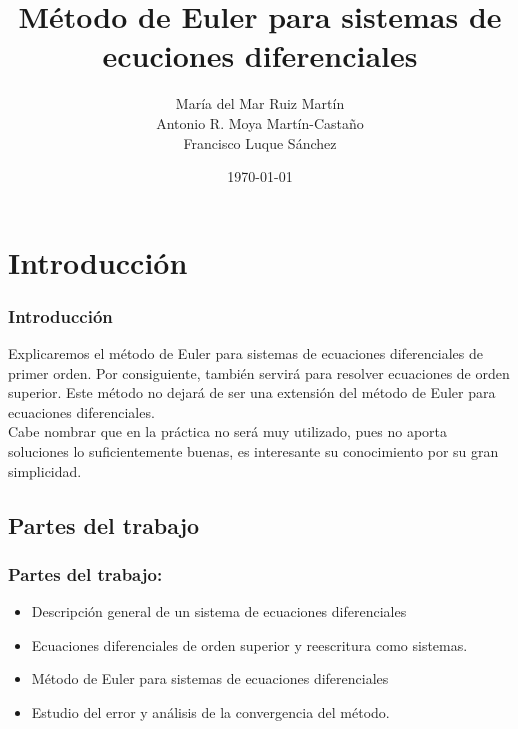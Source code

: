 \documentclass{beamer}
\title[Método de Euler para sist. de ecuaciones]{Método de Euler para sistemas de ecuciones diferenciales} %
\author{María del Mar Ruiz Martín\\
        Antonio R. Moya Martín-Castaño\\
        Francisco Luque Sánchez} %
\institute[UGR] %
{
  Universidad de Granada \\ %
}
\date{\today} %
\begin{document}
\begin{frame}
\titlepage 
\end{frame}


\section{Introducción}
\begin{frame}
  \frametitle{Introducción}
  Explicaremos el método de Euler para sistemas de ecuaciones diferenciales de primer orden. Por consiguiente, también servirá para resolver ecuaciones de orden superior. Este método no dejará de ser una extensión del método de Euler para ecuaciones diferenciales. \\
  
  Cabe nombrar que en la práctica no será muy utilizado, pues no aporta soluciones lo suficientemente buenas, es interesante su conocimiento por su gran simplicidad.
  
\end{frame}


\subsection{Partes del trabajo}
\begin{frame}
	\frametitle{Partes del trabajo:}
	\begin{itemize}
		\item Descripción general de un sistema de ecuaciones diferenciales
		\item Ecuaciones diferenciales de orden superior y reescritura como sistemas.
		\item Método de Euler para sistemas de ecuaciones diferenciales
		\item Estudio del error y análisis de la convergencia del método.
		
	\end{itemize}
\end{frame}
\end{document}

